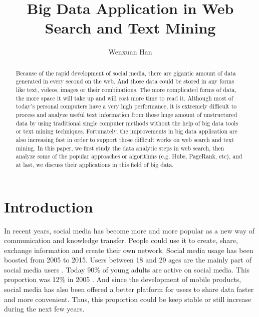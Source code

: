 \documentclass[sigconf]{acmart}
\begin{document}
\title{Big Data Application in Web Search and Text Mining}


\author{Wenxuan Han}



\begin{abstract}
Because of the rapid development of social media, there are gigantic amount of data generated in every second on the web. And those data could be stored in any forms like text, videos, images or their combinations. The more complicated forms of data, the more space it will take up and will cost more time to read it. Although most of today's personal computers have a very high performance, it is extremely difficult to process and analyze useful text information from those huge amount of unstructured data by using traditional single computer methods without the help of big data tools or text mining techniques. Fortunately, the improvements in big data application are also increasing fast in order to support those difficult works on web search and text mining. In this paper, we first study the data analytic steps in web search, then analyze some of the popular approaches or algorithms (e.g. Hubs, PageRank, etc), and at last, we discuss their applications in this field of big data.
\end{abstract}



\maketitle

\section{Introduction}

In recent years, social media has become more and more popular as a new way of communication and knowledge transfer. People could use it to create, share, exchange information and create their own network. Social media usage has been boosted from 2005 to 2015. Users between 18 and 29 ages are the mainly part of social media users \cite{editor01}. Today 90\% of young adults are active on social media. This proportion was 12\% in 2005 \cite{editor02}. And since the development of mobile products, social media has also been offered a better platform for users to share data faster and more convenient. Thus, this proportion could be keep stable or still increase during the next few years.
\end{document}
